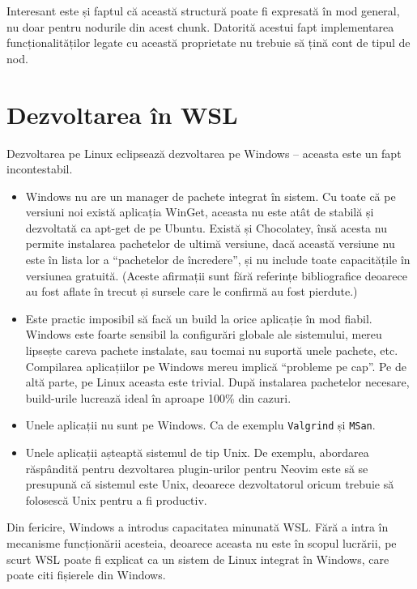 \documentclass[a4paper,12pt]{report}
\begin{document}
Interesant este și faptul că această structură poate fi expresată în mod general,
nu doar pentru nodurile din acest chunk.
Datorită acestui fapt implementarea funcționalităților legate cu această proprietate
nu trebuie să țină cont de tipul de nod.


\section{Dezvoltarea în \ac{WSL}}

Dezvoltarea pe Linux eclipsează dezvoltarea pe Windows -- aceasta este un fapt incontestabil.
\begin{itemize}
    \item 
        Windows nu are un manager de pachete integrat în sistem.
        Cu toate că pe versiuni noi există aplicația WinGet, 
        aceasta nu este atât de stabilă și dezvoltată ca apt-get de pe Ubuntu.
        Există și Chocolatey, însă acesta nu permite instalarea pachetelor de ultimă versiune,
        dacă această versiune nu este în lista lor a ``pachetelor de încredere'',
        și nu include toate capacitățile în versiunea gratuită.
        (Aceste afirmații sunt fără referințe bibliografice deoarece 
        au fost aflate în trecut și sursele care le confirmă au fost pierdute.)

    \item
        Este practic imposibil să facă un build la orice aplicație în mod fiabil.
        Windows este foarte sensibil la configurări globale ale sistemului,
        mereu lipsește careva pachete instalate, sau tocmai nu suportă unele pachete, etc.
        Compilarea aplicațiilor pe Windows mereu implică ``probleme pe cap''.
        Pe de altă parte, pe Linux aceasta este trivial.
        După instalarea pachetelor necesare, build-urile lucrează ideal în aproape 100\% din cazuri.

    \item
        Unele aplicații nu sunt pe Windows.
        Ca de exemplu \texttt{Valgrind} și \texttt{MSan}.

    \item
        Unele aplicații așteaptă sistemul de tip Unix.
        De exemplu, abordarea răspândită pentru dezvoltarea plugin-urilor
        pentru Neovim este să se presupună că sistemul este Unix,
        deoarece dezvoltatorul oricum trebuie să folosescă Unix pentru a fi productiv.
\end{itemize}

Din fericire, Windows a introdus capacitatea minunată \ac{WSL}.
Fără a intra în mecanisme funcționării acesteia, deoarece aceasta nu este în scopul lucrării,
pe scurt \ac{WSL} poate fi explicat ca un sistem de Linux integrat în Windows, care poate citi fișierele din Windows.
\end{document}
